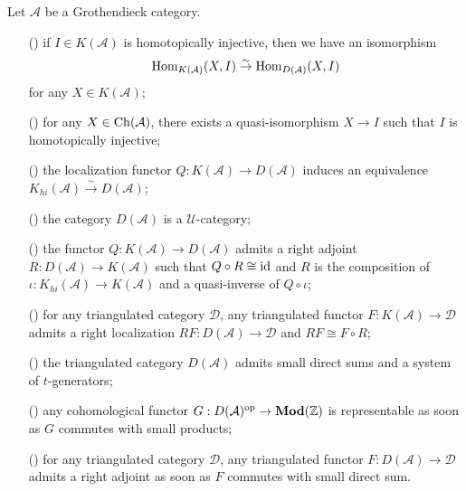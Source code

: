 \begin{theorem}\label{abelian Grothendieck unbounded derived category prop}
Let $\mathcal{A}$ be a Grothendieck category.
\begin{enumerate}
    \item[(\rmnum{1})] if $I\in K(\mathcal{A})$ is homotopically injective, then we have an isomorphism
    \[\mathrm{Hom}_{K(\mathcal{A})}(X,I)\stackrel{\sim}{\to} \mathrm{Hom}_{D(\mathcal{A})}(X,I)\]
    for any $X\in K(\mathcal{A})$;
    \item[(\rmnum{2})] for any $X\in\mathrm{Ch}(\mathcal{A})$, there exists a quasi-isomorphism $X\to I$ such that $I$ is homotopically injective;
    \item[(\rmnum{3})] the localization functor $Q:K(\mathcal{A})\to D(\mathcal{A})$ induces an equivalence $K_{hi}(\mathcal{A})\stackrel{\sim}{\to} D(\mathcal{A})$;
    \item[(\rmnum{4})] the category $D(\mathcal{A})$ is a $\mathscr{U}$-category;
    \item[(\rmnum{5})] the functor $Q:K(\mathcal{A})\to D(\mathcal{A})$ admits a right adjoint $R:D(\mathcal{A})\to K(\mathcal{A})$ such that $Q\circ R\cong\operatorname{id}$ and $R$ is the composition of $\iota:K_{hi}(\mathcal{A})\to K(\mathcal{A})$ and a quasi-inverse of $Q\circ\iota$;
    \item[(\rmnum{6})] for any triangulated category $\mathcal{D}$, any triangulated functor $F:K(\mathcal{A})\to\mathcal{D}$ admits a right localization $RF:D(\mathcal{A})\to\mathcal{D}$ and $RF\cong F\circ R$;
    \item[(\rmnum{7})] the triangulated category $D(\mathcal{A})$ admits small direct sums and a system of $t$-generators;
    \item[(\rmnum{8})] any cohomological functor $G:D(\mathcal{A})^{\mathrm{op}}\to\mathbf{Mod}(\mathbb{Z})$ is representable as soon as $G$ commutes with small products;
    \item[(\rmnum{9})] for any triangulated category $\mathcal{D}$, any triangulated functor $F:D(\mathcal{A})\to\mathcal{D}$ admits a right adjoint as soon as $F$ commutes with small direct sum.
\end{enumerate}
\end{theorem}

